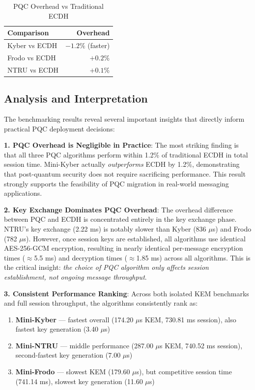 \documentclass[11pt,a4paper]{article}
\begin{document}
\begin{table}[H]
\centering
\caption{PQC Overhead vs Traditional ECDH}
\label{tab:overhead}
\begin{tabular}{l|r}
\toprule
\textbf{Comparison} & \textbf{Overhead} \\
\midrule
Kyber vs ECDH & $-1.2\%$ (faster) \\
Frodo vs ECDH & $+0.2\%$ \\
NTRU vs ECDH & $+0.1\%$ \\
\bottomrule
\end{tabular}
\end{table}

\subsection{Analysis and Interpretation}

The benchmarking results reveal several important insights that directly inform practical PQC deployment decisions:

\textbf{1. PQC Overhead is Negligible in Practice}: The most striking finding is that all three PQC algorithms perform within 1.2\% of traditional ECDH in total session time. Mini-Kyber actually \textit{outperforms} ECDH by 1.2\%, demonstrating that post-quantum security does not require sacrificing performance. This result strongly supports the feasibility of PQC migration in real-world messaging applications.

\textbf{2. Key Exchange Dominates PQC Overhead}: The overhead difference between PQC and ECDH is concentrated entirely in the key exchange phase. NTRU's key exchange (2.22 ms) is notably slower than Kyber (836 $\mu$s) and Frodo (782 $\mu$s). However, once session keys are established, all algorithms use identical AES-256-GCM encryption, resulting in nearly identical per-message encryption times ($\approx$5.5 ms) and decryption times ($\approx$1.85 ms) across all algorithms. This is the critical insight: \textit{the choice of PQC algorithm only affects session establishment, not ongoing message throughput}.

\textbf{3. Consistent Performance Ranking}: Across both isolated KEM benchmarks and full session throughput, the algorithms consistently rank as:
\begin{enumerate}
    \item \textbf{Mini-Kyber} --- fastest overall (174.20 $\mu$s KEM, 730.81 ms session), also fastest key generation (3.40 $\mu$s)
    \item \textbf{Mini-NTRU} --- middle performance (287.00 $\mu$s KEM, 740.52 ms session), second-fastest key generation (7.00 $\mu$s)
    \item \textbf{Mini-Frodo} --- slowest KEM (179.60 $\mu$s), but competitive session time (741.14 ms), slowest key generation (11.60 $\mu$s)
\end{enumerate}
\end{document}
